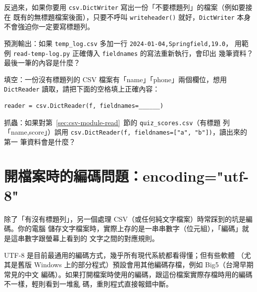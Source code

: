 

反過來，如果你要用 \texttt{csv.DictWriter} 寫出一份「不要標題列」的檔案（例如要接在
既有的無標題檔案後面），只要不呼叫 \texttt{writeheader()} 就好，\texttt{DictWriter}
本身不會強迫你一定要寫標題列。

\begin{drills}[label=drills:csv-no-header]
\item 預測輸出：如果 \texttt{temp\_log.csv} 多加一行 \texttt{2024-01-04,Springfield,19.0}，
用範例 \texttt{read-temp-log.py} 正確傳入 \texttt{fieldnames} 的寫法重新執行，會印出
幾筆資料？最後一筆的內容是什麼？
\item 填空：一份沒有標題列的 CSV 檔案有「name」「phone」兩個欄位，想用 \texttt{DictReader}
讀取，請把下面的空格填上正確內容：
\begin{verbatim}
reader = csv.DictReader(f, fieldnames=______)
\end{verbatim}
\item 抓蟲：如果對第~\ref{sec:csv-module-read}~節的 \texttt{quiz\_scores.csv}（有標題
列「name,score」）誤用 \texttt{csv.DictReader(f, fieldnames=["a", "b"])}，讀出來的第一
筆資料會是什麼？
\end{drills}

\section{開檔案時的編碼問題：encoding="utf-8"}
\label{sec:csv-encoding}

除了「有沒有標題列」，另一個處理 CSV（或任何純文字檔案）時常踩到的坑是編碼。你的電腦
儲存文字檔案時，實際上存的是一串串數字（位元組），「編碼」就是這串數字跟螢幕上看到的
文字之間的對應規則。

UTF-8 是目前最通用的編碼方式，幾乎所有現代系統都看得懂；但有些軟體
（尤其是舊版 Windows 上的部分程式）預設會用其他編碼存檔，例如 Big5（台灣早期常見的中文
編碼）。如果打開檔案時使用的編碼，跟這份檔案實際存檔時用的編碼不一樣，輕則看到一堆亂
碼，重則程式直接報錯中斷。

